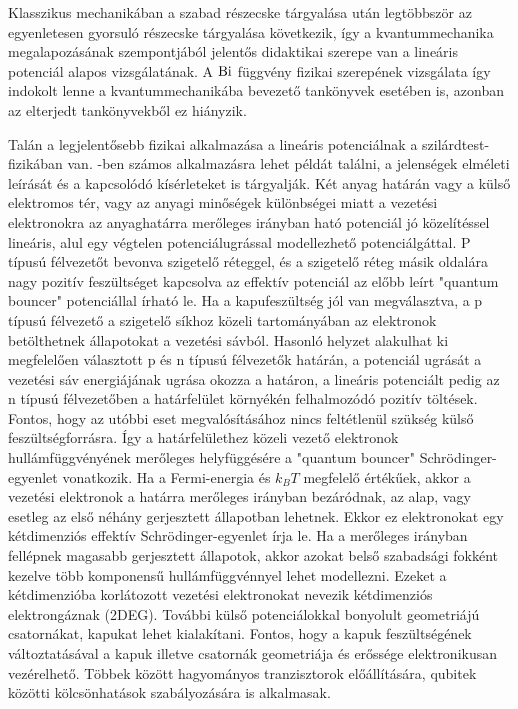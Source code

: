 Klasszikus mechanikában a szabad részecske tárgyalása után legtöbbször az egyenletesen gyorsuló részecske tárgyalása következik, így a kvantummechanika megalapozásának szempontjából jelentős didaktikai szerepe van a lineáris potenciál alapos vizsgálatának. A $\mathrm{Bi}$ függvény fizikai szerepének vizsgálata így indokolt lenne a kvantummechanikába bevezető tankönyvek esetében is, azonban az elterjedt tankönyvekből ez hiányzik.

Talán a legjelentősebb fizikai alkalmazása a lineáris potenciálnak a szilárdtest-fizikában van. \cite{Beenakker_1991}-ben számos alkalmazásra lehet példát találni, a jelenségek elméleti leírását és a kapcsolódó kísérleteket is tárgyalják. Két anyag határán vagy a külső elektromos tér, vagy az anyagi minőségek különbségei miatt a vezetési elektronokra az anyaghatárra merőleges irányban ható potenciál jó közelítéssel lineáris, alul egy végtelen potenciálugrással modellezhető potenciálgáttal. P típusú félvezetőt bevonva szigetelő réteggel, és a szigetelő réteg másik oldalára nagy pozitív feszültséget kapcsolva az effektív potenciál az előbb leírt "quantum bouncer" potenciállal írható le. Ha a kapufeszültség jól van megválasztva, a p típusú félvezető a szigetelő síkhoz közeli tartományában az elektronok betölthetnek állapotokat a vezetési sávból. Hasonló helyzet alakulhat ki megfelelően választott p és n típusú félvezetők határán, a potenciál ugrását a vezetési sáv energiájának ugrása okozza a határon, a lineáris potenciált pedig az n típusú félvezetőben a határfelület környékén felhalmozódó pozitív töltések. Fontos, hogy az utóbbi eset megvalósításához nincs feltétlenül szükség külső feszültségforrásra. Így a határfelülethez közeli vezető elektronok hullámfüggvényének merőleges helyfüggésére a "quantum bouncer" Schrödinger-egyenlet vonatkozik. Ha a Fermi-energia és $k_BT$ megfelelő értékűek, akkor a vezetési elektronok a határra merőleges irányban bezáródnak, az alap, vagy esetleg az első néhány gerjesztett állapotban lehetnek. Ekkor ez elektronokat egy kétdimenziós effektív Schrödinger-egyenlet írja le. Ha a merőleges irányban fellépnek magasabb gerjesztett állapotok, akkor azokat belső szabadsági fokként kezelve több komponensű hullámfüggvénnyel lehet modellezni. Ezeket a kétdimenzióba korlátozott vezetési elektronokat nevezik kétdimenziós elektrongáznak (2DEG). További külső potenciálokkal bonyolult geometriájú csatornákat, kapukat lehet kialakítani. Fontos, hogy a kapuk feszültségének változtatásával a kapuk illetve csatornák geometriája és erőssége elektronikusan vezérelhető. Többek között hagyományos tranzisztorok előállítására, qubitek közötti kölcsönhatások szabályozására is alkalmasak.

